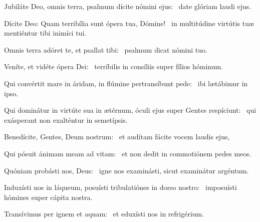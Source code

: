 \item Jubiláte Deo, omnis terra, psalmum dícite nómini ejus:~\psstar{} date glóriam laudi ejus.

\item Dícite Deo: Quam terribília sunt ópera tua, Dómine!~\psstar{} in multitúdine virtútis tuæ mentiéntur tibi inimíci tui.

\item Omnis terra adóret te, et psallat tibi:~\psstar{} psalmum dicat nómini tuo.

\item Veníte, et vidéte ópera Dei:~\psstar{} terríbilis in consíliis super fílios hóminum.

\item Qui convértit mare in áridam, in flúmine pertransíbunt pede:~\psstar{} ibi lætábimur in ipso.

\item Qui dominátur in virtúte sua in ætérnum, óculi ejus super Gentes respíciunt:~\psstar{} qui exásperant non exalténtur in semetípsis.

\item Benedícite, Gentes, Deum nostrum:~\psstar{} et audítam fácite vocem laudis ejus,

\item Qui pósuit ánimam meam ad vitam:~\psstar{} et non dedit in commotiónem pedes meos.

\item Quóniam probásti nos, Deus:~\psstar{} igne nos examinásti, sicut examinátur argéntum.

\item Induxísti nos in láqueum, posuísti tribulatiónes in dorso nostro:~\psstar{} imposuísti hómines super cápita nostra.

\item Transívimus per ignem et aquam:~\psstar{} et eduxísti nos in refrigérium.
